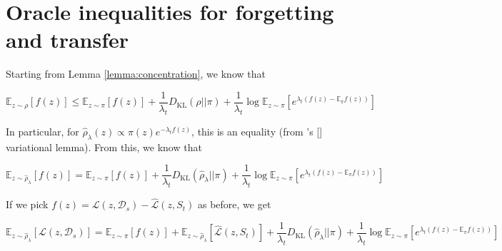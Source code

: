 \documentclass[letterpaper]{article}
\theoremstyle{definition}
\begin{document}


\section{Oracle inequalities for forgetting and transfer}

Starting from Lemma \ref{lemma:concentration}, we know that 

$$\mathbb{E}_{z\sim \rho}\left [f(z) \right ]\leq \mathbb{E}_{z\sim \pi}\left [f(z) \right ]+ \frac{1}{\lambda_t}D_{\mathrm{KL}}(\rho||\pi)+ \frac{1}{\lambda_t}\log\mathbb{E}_{z\sim \pi}\left [e^{\lambda_t(f(z)-\mathbb{E}_\pi f(z))} \right ]$$

In particular, for $\hat{\rho}_\lambda(z)\propto \pi(z) e^{-\lambda_t f(z) }$, this is an equality (from \citeauthor{donsker1975large}'s [\citeyear{donsker1975large}] variational lemma).
From this, we know that

\begin{equation}
\mathbb{E}_{z\sim \hat{\rho}_\lambda}\left [f(z) \right ]= \mathbb{E}_{z\sim \pi}\left [f(z) \right ]+ \frac{1}{\lambda_t}D_{\mathrm{KL}}(\hat{\rho}_\lambda||\pi)+ \frac{1}{\lambda_t}\log\mathbb{E}_{z\sim \pi}\left [e^{\lambda_t(f(z)-\mathbb{E}_\pi f(z))} \right ]
\end{equation}

If we pick $f(z)=\mathcal{L}(z,\mathcal{D}_s)-\hat{\mathcal{L}}(z,S_t)$ as before, we get

$$\mathbb{E}_{z\sim \hat{\rho}_\lambda}\left [\mathcal{L}(z,\mathcal{D}_s) \right ]= \mathbb{E}_{z\sim \pi}\left [f(z) \right ]+\mathbb{E}_{z\sim \hat{\rho}_\lambda}\left [\hat{\mathcal{L}}(z,S_t) \right ]+ \frac{1}{\lambda_t}D_{\mathrm{KL}}(\hat{\rho}_\lambda||\pi)+ \frac{1}{\lambda_t}\log\mathbb{E}_{z\sim \pi}\left [e^{\lambda_t(f(z)-\mathbb{E}_\pi f(z))} \right ]$$
\end{document}
